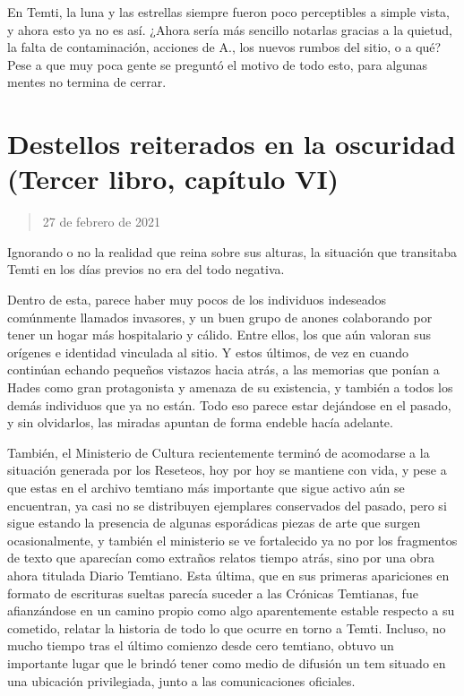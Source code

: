 \documentclass[
  spanish,
]{book}
\begin{document}
En Temti, la luna y las estrellas siempre fueron poco perceptibles a simple vista, y ahora esto ya no es así. ¿Ahora sería más sencillo notarlas gracias a la quietud, la falta de contaminación, acciones de A., los nuevos rumbos del sitio, o a qué? Pese a que muy poca gente se preguntó el motivo de todo esto, para algunas mentes no termina de cerrar.

\hypertarget{destellos-reiterados-en-la-oscuridad-tercer-libro-capuxedtulo-vi}{%
\section{Destellos reiterados en la oscuridad (Tercer libro, capítulo VI)}\label{destellos-reiterados-en-la-oscuridad-tercer-libro-capuxedtulo-vi}}

\begin{quote}
27 de febrero de 2021
\end{quote}

Ignorando o no la realidad que reina sobre sus alturas, la situación que transitaba Temti en los días previos no era del todo negativa.

Dentro de esta, parece haber muy pocos de los individuos indeseados comúnmente llamados invasores, y un buen grupo de anones colaborando por tener un hogar más hospitalario y cálido. Entre ellos, los que aún valoran sus orígenes e identidad vinculada al sitio. Y estos últimos, de vez en cuando continúan echando pequeños vistazos hacia atrás, a las memorias que ponían a Hades como gran protagonista y amenaza de su existencia, y también a todos los demás individuos que ya no están. Todo eso parece estar dejándose en el pasado, y sin olvidarlos, las miradas apuntan de forma endeble hacía adelante.

También, el Ministerio de Cultura recientemente terminó de acomodarse a la situación generada por los Reseteos, hoy por hoy se mantiene con vida, y pese a que estas en el archivo temtiano más importante que sigue activo aún se encuentran, ya casi no se distribuyen ejemplares conservados del pasado, pero si sigue estando la presencia de algunas esporádicas piezas de arte que surgen ocasionalmente, y también el ministerio se ve fortalecido ya no por los fragmentos de texto que aparecían como extraños relatos tiempo atrás, sino por una obra ahora titulada Diario Temtiano. Esta última, que en sus primeras apariciones en formato de escrituras sueltas parecía suceder a las Crónicas Temtianas, fue afianzándose en un camino propio como algo aparentemente estable respecto a su cometido, relatar la historia de todo lo que ocurre en torno a Temti. Incluso, no mucho tiempo tras el último comienzo desde cero temtiano, obtuvo un importante lugar que le brindó tener como medio de difusión un tem situado en una ubicación privilegiada, junto a las comunicaciones oficiales.
\end{document}

